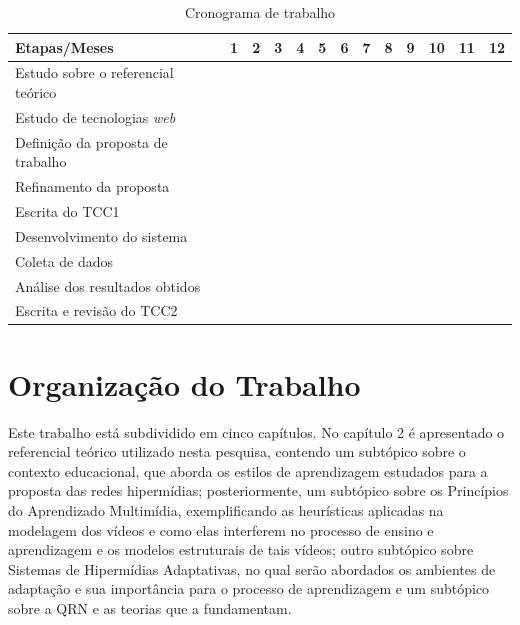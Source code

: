 {
\begin{table}
	\centering
	\begin{tabular}{| p{6cm} | c | c | c | c | c | c | c | c | c | c | c | c |}
	\hline
	\rowcolor{lightgray} Etapas/Meses & 1 & 2 & 3 & 4 & 5 & 6 & 7 & 8 & 9 & 10 & 11 & 12 \\
	\hline
	Estudo sobre o referencial teórico & \cellcolor[HTML]{888888} & \cellcolor[HTML]{888888} & \cellcolor[HTML]{888888} & & & & & & & & & \\
	\hline
	Estudo de tecnologias \textit{web} & & & \cellcolor[HTML]{888888} & \cellcolor[HTML]{888888} & & & & & & & & \\
	\hline
	Definição da proposta de trabalho & & & & \cellcolor[HTML]{888888} & & & & & & & & \\
	\hline
	Refinamento da proposta & & & & \cellcolor[HTML]{888888} & \cellcolor[HTML]{888888} & & & & & & & \\
	\hline
	Escrita do TCC1 & & & & & \cellcolor[HTML]{888888} & \cellcolor[HTML]{888888} & & & & & & \\
	\hline
	Desenvolvimento do sistema & & & & & \cellcolor[HTML]{888888} & \cellcolor[HTML]{888888} & \cellcolor[HTML]{888888} & \cellcolor[HTML]{888888} & \cellcolor[HTML]{888888} & \cellcolor[HTML]{888888} & \cellcolor[HTML]{888888} & \\
	\hline
	Coleta de dados & & & & & & & & & \cellcolor[HTML]{888888} & \cellcolor[HTML]{888888} & \cellcolor[HTML]{888888} & \\
	\hline
	Análise dos resultados obtidos & & & & & & & & & \cellcolor[HTML]{888888} & \cellcolor[HTML]{888888} & \cellcolor[HTML]{888888} & \cellcolor[HTML]{888888} \\
	\hline
	Escrita e revisão do TCC2 & & & & & & & & & & & \cellcolor[HTML]{888888} & \cellcolor[HTML]{888888} \\
	\hline
	\end{tabular}
	\caption{Cronograma de trabalho}
\end{table}

\section[Organização do Trabalho]{Organização do Trabalho}

Este trabalho está subdividido em cinco capítulos. No capítulo 2 é apresentado o referencial teórico utilizado nesta pesquisa, contendo um subtópico sobre o contexto educacional, que aborda os estilos de aprendizagem estudados para a proposta das redes hipermídias; posteriormente, um subtópico sobre os Princípios do Aprendizado Multimídia, exemplificando as heurísticas aplicadas na modelagem dos vídeos e como elas interferem no processo de ensino e aprendizagem e os modelos estruturais de tais vídeos; outro subtópico sobre Sistemas de Hipermídias Adaptativas, no qual serão abordados os ambientes de adaptação e sua importância para o processo de aprendizagem e um subtópico sobre a QRN e as teorias que a fundamentam.

}
